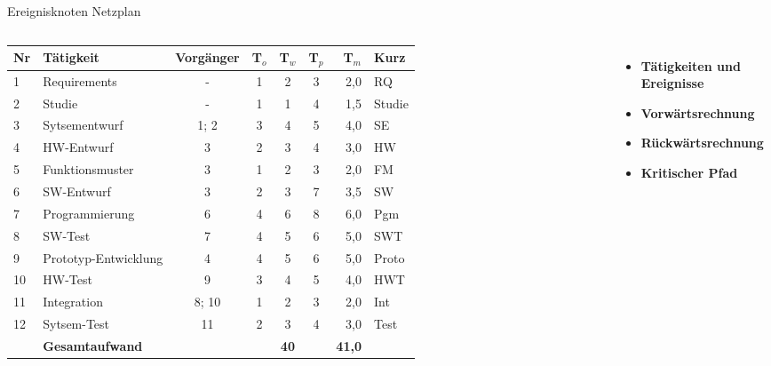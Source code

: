 \documentclass{beamer}
\begin{document}
\begin{frame}[t,shrink=65]{Ereignisknoten Netzplan}
\begin{columns}
    \par\vspace{2cm}\noindent       %
    {\Large
    \begin{tabular}{l|lccccrl}
      Nr  & Tätigkeit       & Vorgänger & T$_{o}$ & T$_{w}$ & T$_{p}$ & T$_{m}$ & Kurz \\
    \hline
       1  & Requirements          & -     & 1 & 2 & 3   & 2,0 & RQ  \\
       2  & Studie                & -     & 1 & 1 & 4   & 1,5 & Studie\\
       3  & Sytsementwurf         & 1; 2  & 3 & 4 & 5   & 4,0 & SE  \\
       4  & HW-Entwurf            & 3     & 2 & 3 & 4   & 3,0 & HW  \\
       5  & Funktionsmuster       & 3     & 1 & 2 & 3   & 2,0 & FM  \\
       6  & SW-Entwurf            & 3     & 2 & 3 & 7   & 3,5 & SW  \\
       7  & Programmierung        & 6     & 4 & 6 & 8   & 6,0 & Pgm \\
       8  & SW-Test               & 7     & 4 & 5 & 6   & 5,0 & SWT \\
       9  & Prototyp-Entwicklung  & 4     & 4 & 5 & 6   & 5,0 & Proto \\
      10  & HW-Test               & 9     & 3 & 4 & 5   & 4,0 & HWT \\
      11  & Integration           & 8; 10 & 1 & 2 & 3   & 2,0 & Int \\
      12  & Sytsem-Test           & 11    & 2 & 3 & 4   & 3,0 & Test \\
    \hline
          & \textbf{Gesamtaufwand} & & & \textbf{40} & & \textbf{41,0} \\
    \end{tabular}
    }
    \par\vspace{1em}\noindent       %
    {\huge
    \begin{itemize}
      \item<only@1-8> \textbf{Tätigkeiten und Ereignisse}
      \item<only@9-17> \textbf{Vorwärtsrechnung}
      \item<only@18-26> \textbf{Rückwärtsrechnung}
      \item<only@27-> \textbf{Kritischer Pfad}


\end{itemize}}
\end{columns}
\end{frame}
\end{document}
